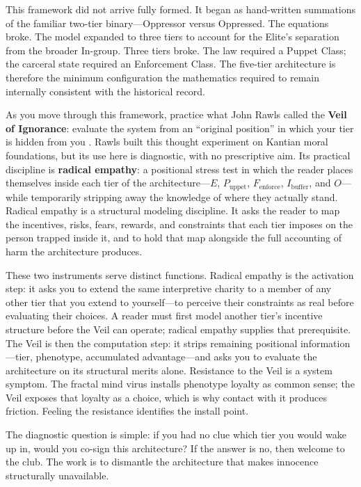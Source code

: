 \documentclass[12pt,openany]{book}
\numberwithin{equation}{chapter}
\begin{document}
This framework did not arrive fully formed. It began as hand-written
summations of the familiar two-tier binary---Oppressor versus Oppressed. The
equations broke. The model expanded to three tiers to account for the Elite's
separation from the broader In-group. Three tiers broke. The law required a
Puppet Class; the carceral state required an Enforcement Class. The five-tier
architecture is therefore the
minimum configuration the mathematics required to remain internally consistent
with the historical record.

\begin{definition}
As you move through this framework, practice what John Rawls called the
\textbf{Veil of Ignorance}: evaluate the system from an ``original position''
in which your tier is hidden from you \cite{rawls_theory_justice}.
Rawls built this thought experiment on Kantian moral foundations, but its use
here is diagnostic, with no prescriptive aim. Its practical discipline is
\textbf{radical empathy}: a positional stress test in which the reader places
themselves inside each tier of the architecture---$E$, $P_{\text{uppet}}$,
$F_{\text{enforce}}$, $I_{\text{buffer}}$, and $O$---while temporarily stripping
away the knowledge of where they actually stand. Radical empathy is a structural
modeling discipline. It asks the reader to map the incentives, risks, fears,
rewards, and constraints that each tier imposes on the person trapped inside it,
and to hold that map alongside the full accounting of harm the architecture
produces.

These two instruments serve distinct functions. Radical empathy is the
activation step: it asks you to extend the same interpretive charity to a member
of any other tier that you extend to yourself---to perceive their constraints as
real before evaluating their choices. A reader must first model another tier's
incentive structure before the Veil can operate; radical empathy supplies that
prerequisite. The Veil is then the computation step: it strips remaining
positional information---tier, phenotype, accumulated advantage---and asks you
to evaluate the architecture on its structural merits alone. Resistance to the
Veil is a system symptom. The fractal mind virus installs phenotype loyalty as
common sense; the Veil exposes that loyalty as a choice, which is why contact
with it produces friction. Feeling the resistance identifies the install point.

The diagnostic question is simple: if you had no clue which tier you would wake
up in, would you co-sign this architecture? If the answer is no, then welcome to
the club. The work is to dismantle the architecture that makes innocence
structurally unavailable.
\end{definition}
\end{document}
